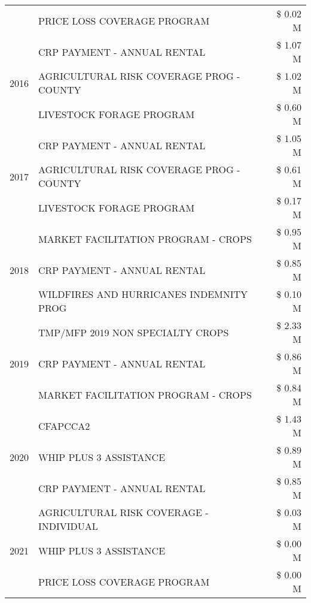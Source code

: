 \begin{tabular}{llr}
 & PRICE LOSS COVERAGE PROGRAM & \$ 0.02 M \\
\cline{1-3}
\multirow[t]{3}{*}{2016} & CRP PAYMENT - ANNUAL RENTAL & \$ 1.07 M \\
 & AGRICULTURAL RISK COVERAGE PROG - COUNTY & \$ 1.02 M \\
 & LIVESTOCK FORAGE PROGRAM & \$ 0.60 M \\
\cline{1-3}
\multirow[t]{3}{*}{2017} & CRP PAYMENT - ANNUAL RENTAL & \$ 1.05 M \\
 & AGRICULTURAL RISK COVERAGE PROG - COUNTY & \$ 0.61 M \\
 & LIVESTOCK FORAGE PROGRAM & \$ 0.17 M \\
\cline{1-3}
\multirow[t]{3}{*}{2018} & MARKET FACILITATION PROGRAM - CROPS & \$ 0.95 M \\
 & CRP PAYMENT - ANNUAL RENTAL & \$ 0.85 M \\
 & WILDFIRES AND HURRICANES INDEMNITY PROG & \$ 0.10 M \\
\cline{1-3}
\multirow[t]{3}{*}{2019} & TMP/MFP 2019 NON SPECIALTY CROPS & \$ 2.33 M \\
 & CRP PAYMENT - ANNUAL RENTAL & \$ 0.86 M \\
 & MARKET FACILITATION PROGRAM - CROPS & \$ 0.84 M \\
\cline{1-3}
\multirow[t]{3}{*}{2020} & CFAPCCA2 & \$ 1.43 M \\
 & WHIP PLUS 3 ASSISTANCE & \$ 0.89 M \\
 & CRP PAYMENT - ANNUAL RENTAL & \$ 0.85 M \\
\cline{1-3}
\multirow[t]{3}{*}{2021} & AGRICULTURAL RISK COVERAGE - INDIVIDUAL & \$ 0.03 M \\
 & WHIP PLUS 3 ASSISTANCE & \$ 0.00 M \\
 & PRICE LOSS COVERAGE PROGRAM & \$ 0.00 M \\
\cline{1-3}
\bottomrule
\end{tabular}
